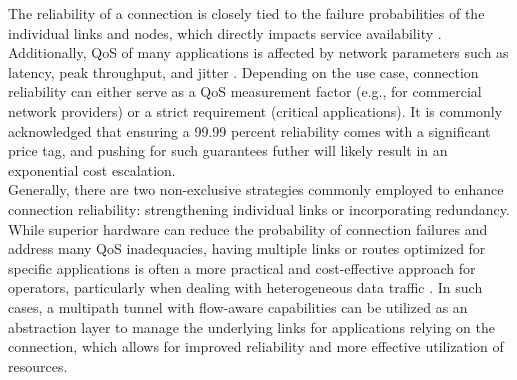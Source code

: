 The reliability of a connection is closely tied to the failure probabilities of the individual links and nodes, which directly impacts service availability \cite{shooman_algorithms_1995}. 
Additionally, \ac{QoS} of many applications is affected by network parameters such as latency, peak throughput, and jitter \cite{gozdecki_quality_2003}.
Depending on the use case, connection reliability can either serve as a \ac{QoS} measurement factor (e.g., for commercial network providers) or a strict requirement (critical applications). 
It is commonly acknowledged that ensuring a 99.99 percent reliability comes with a significant price tag, and pushing for such guarantees futher will likely result in an exponential cost escalation.
\\

Generally, there are two non-exclusive strategies commonly employed to enhance connection reliability: strengthening individual links or incorporating redundancy.
While superior hardware can reduce the probability of connection failures and address many \ac{QoS} inadequacies, having multiple links or routes optimized for specific applications is often a more practical and cost-effective approach for operators, particularly when dealing with heterogeneous data traffic \cite{chen_overview_1998}.
In such cases, a multipath tunnel with flow-aware capabilities can be utilized as an abstraction layer to manage the underlying links for applications relying on the connection, which allows for improved reliability and more effective utilization of resources. 



